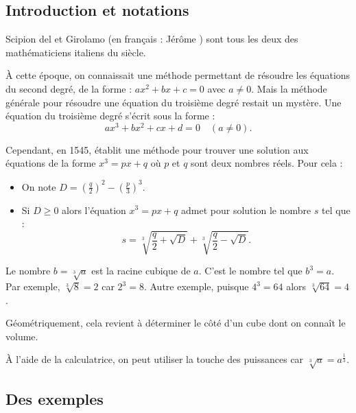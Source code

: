 \documentclass[10pt,openright,twoside,french]{book}
\begin{document}
\newcommand\Cardan{\bsc{Cardan}\xspace}

{\small
{}

\subsection*{Introduction et notations}

Scipion del  et Girolamo  (en français : Jérôme ) sont tous les deux des mathématiciens italiens du \ieme siècle.

À cette époque, on connaissait une méthode permettant de résoudre les équations du second degré, de la forme : $ax^2 + bx + c = 0$ avec $a \neq 0$. Mais la méthode générale pour résoudre une équation du troisième degré restait un mystère. Une équation du troisième degré s'écrit sous la forme : \[ax^3 + bx^2 + cx + d = 0 \quad (a \neq 0).\]

Cependant, en \num{1545}, \Cardan établit une méthode pour trouver une solution aux équations de la forme $x^3 = px + q$ où $p$ et $q$ sont deux nombres réels. Pour cela :

\begin{itemize}
    \item On note $D = \left(\frac q 2\right)^2 - \left(\frac p 3\right)^3$.
    \item Si $D \geq 0$ alors l'équation $x^3 = px + q$ admet pour solution le nombre $s$ tel que :
    \[s = \sqrt[3]{\dfrac q 2 + \sqrt D} + \sqrt[3]{\dfrac q 2 - \sqrt D}.\]
\end{itemize}

Le nombre $b = \sqrt[3]{a}$ est la racine cubique de $a$. C'est le nombre tel que $b^3 = a$. Par exemple, $\sqrt[3]{8} = 2$ car $2^3 = 8$. Autre exemple, puisque $4^3 = 64$ alors $\sqrt[3]{64} = 4$.\par
Géométriquement, cela revient à déterminer le côté d'un cube dont on connaît le volume.\par
À l'aide de la calculatrice, on peut utiliser la touche des puissances car $\sqrt[3]{a} = a^{\frac 13}$.

\subsection*{Des exemples}

}
\end{document}
